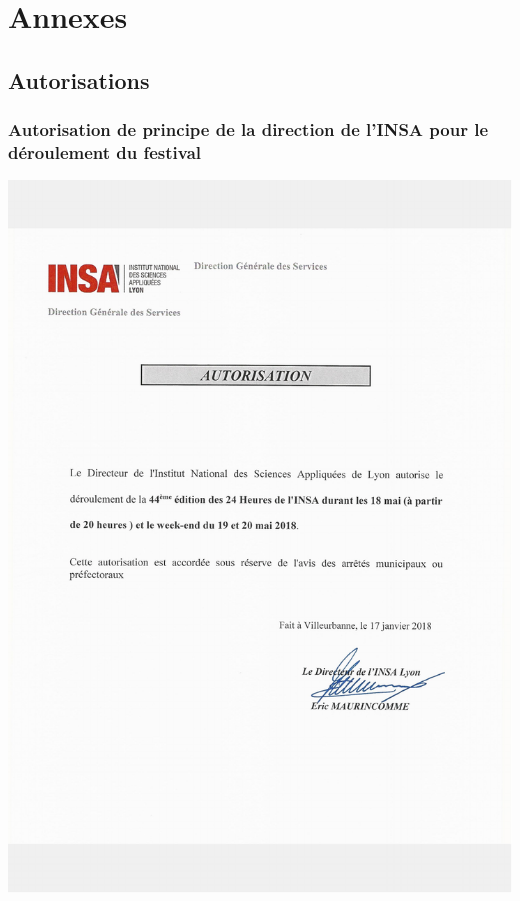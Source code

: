 \documentclass[hidelinks, paper=a4, fontsize=13pt]{report}
\begin{document}

\chapter{Annexes}
\section{Autorisations}

\newpage

\subsection{Autorisation de principe de la direction de l’INSA pour le déroulement du festival}
\begin{center}\includegraphics[scale=0.7]{Annexes/Documents/INSAAutorisationPrincipe}
\end{center}
\end{document}
